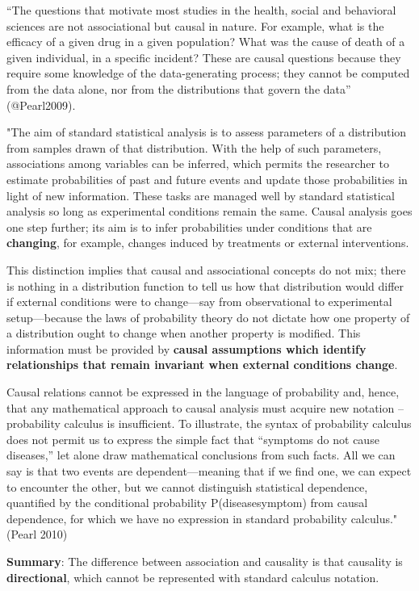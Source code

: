 \documentclass[
]{article}
\begin{document}
``The questions that motivate most studies in the health, social and
behavioral sciences are not associational but causal in nature. For
example, what is the efficacy of a given drug in a given population?
What was the cause of death of a given individual, in a specific
incident? These are causal questions because they require some knowledge
of the data-generating process; they cannot be computed from the data
alone, nor from the distributions that govern the data'' (@Pearl2009).

"The aim of standard statistical analysis is to assess parameters of a
distribution from samples drawn of that distribution. With the help of
such parameters, associations among variables can be inferred, which
permits the researcher to estimate probabilities of past and future
events and update those probabilities in light of new information. These
tasks are managed well by standard statistical analysis so long as
experimental conditions remain the same. Causal analysis goes one step
further; its aim is to infer probabilities under conditions that are
\textbf{changing}, for example, changes induced by treatments or
external interventions.

This distinction implies that causal and associational concepts do not
mix; there is nothing in a distribution function to tell us how that
distribution would differ if external conditions were to change---say
from observational to experimental setup---because the laws of
probability theory do not dictate how one property of a distribution
ought to change when another property is modified. This information must
be provided by \textbf{causal assumptions which identify relationships
that remain invariant when external conditions change}.

Causal relations cannot be expressed in the language of probability and,
hence, that any mathematical approach to causal analysis must acquire
new notation -- probability calculus is insufficient. To illustrate, the
syntax of probability calculus does not permit us to express the simple
fact that ``symptoms do not cause diseases,'' let alone draw
mathematical conclusions from such facts. All we can say is that two
events are dependent---meaning that if we find one, we can expect to
encounter the other, but we cannot distinguish statistical dependence,
quantified by the conditional probability P(disease\textbar symptom)
from causal dependence, for which we have no expression in standard
probability calculus." (Pearl 2010)

\textbf{Summary}: The difference between association and causality is
that causality is \textbf{directional}, which cannot be represented with
standard calculus notation.
\end{document}
